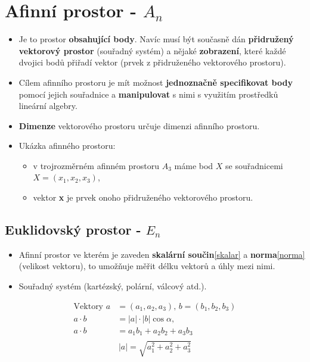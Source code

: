 \section{Afinní prostor - $A_n$}
\begin{itemize}
    \item Je to prostor \textbf{obsahující body}. Navíc musí být současně dán \textbf{přidružený vektorový prostor} (souřadný systém) a nějaké \textbf{zobrazení}, které každé dvojici bodů přiřadí vektor (prvek z přidruženého vektorového prostoru).
    \item Cílem afinního prostoru je mít možnost \textbf{jednoznačně specifikovat body} pomocí jejich souřadnice a \textbf{manipulovat} s nimi s využitím prostředků lineární algebry.
    \item \textbf{Dimenze} vektorového prostoru určuje dimenzi afinního prostoru.
    \item Ukázka afinného prostoru:
          \begin{itemize}
              \item v trojrozměrném afinném prostoru $A_3$ máme bod $X$ se souřadnicemi $X=(x_1,x_2,x_3)$,
              \item vektor \textbf{x} je prvek onoho přidruženého vektorového prostoru.
          \end{itemize}
\end{itemize}


\subsection{Euklidovský prostor - $E_n$}
\begin{itemize}
    \item Afinní prostor ve kterém je zaveden \textbf{skalární součin}\eqref{skalar} a \textbf{norma}\eqref{norma} (velikost vektoru), to umožňuje měřit délku vektorů a úhly mezi nimi.
    \item Souřadný systém (kartézský, polární, válcový atd.).
\end{itemize}
\begin{equation}
    \begin{split}
        \label{skalar}
        \textrm{Vektory }  a &= (a_1,a_2,a_3), \, b = (b_1,b_2,b_3) \\
        a \cdot b &= |a| \cdot |b| \cos \alpha, \\
        a \cdot b &= a_1b_1 + a_2b_2 +a_3b_3 \\
    \end{split}
\end{equation}
\begin{equation}
    \label{norma}
    |a| = \sqrt{a_1^2 + a_2^2 + a_3^2}
\end{equation}

